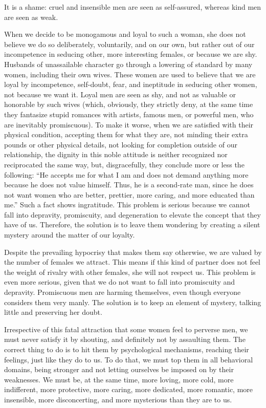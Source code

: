 \par It is a shame: cruel and insensible men are seen as self-assured, whereas kind men are seen as weak.

\par When we decide to be monogamous and loyal to such a woman, she does not believe we do so deliberately, voluntarily, and on our own, but rather out of our incompetence in seducing other, more interesting females, or because we are shy. Husbands of unassailable character go through a lowering of standard by many women, including their own wives. These women are used to believe that we are loyal by incompetence, self-doubt, fear, and ineptitude in seducing other women, not because we want it. Loyal men are seen as shy, and not as valuable or honorable by such wives (which, obviously, they strictly deny, at the same time they fantasize stupid romances with artists, famous men, or powerful men, who are inevitably promiscuous). To make it worse, when we are satisfied with their physical condition, accepting them for what they are, not minding their extra pounds or other physical details, not looking for completion outside of our relationship, the dignity in this noble attitude is neither recognized nor reciprocated the same way, but, disgracefully, they conclude more or less the following: \enquote{He accepts me for what I am and does not demand anything more because he does not value himself. Thus, he is a second-rate man, since he does not want women who are better, prettier, more caring, and more educated than me.} Such a fact shows ingratitude. This problem is serious because we cannot fall into depravity, promiscuity, and degeneration to elevate the concept that they have of us. Therefore, the solution is to leave them wondering by creating a silent mystery around the matter of our loyalty.

\par Despite the prevailing hypocrisy that makes them say otherwise, we are valued by the number of females we attract. This means if this kind of partner does not feel the weight of rivalry with other females, she will not respect us. This problem is even more serious, given that we do not want to fall into promiscuity and depravity. Promiscuous men are harming themselves, even though everyone considers them very manly. The solution is to keep an element of mystery, talking little and preserving her doubt.

\par Irrespective of this fatal attraction that some women feel to perverse men, we must never satisfy it by shouting, and definitely not by assaulting them. The correct thing to do is to hit them by psychological mechanisms, reaching their feelings, just like they do to us. To do that, we must top them in all behavioral domains, being stronger and not letting ourselves be imposed on by their weaknesses. We must be, at the same time, more loving, more cold, more indifferent, more protective, more caring, more dedicated, more romantic, more insensible, more disconcerting, and more mysterious than they are to us.

